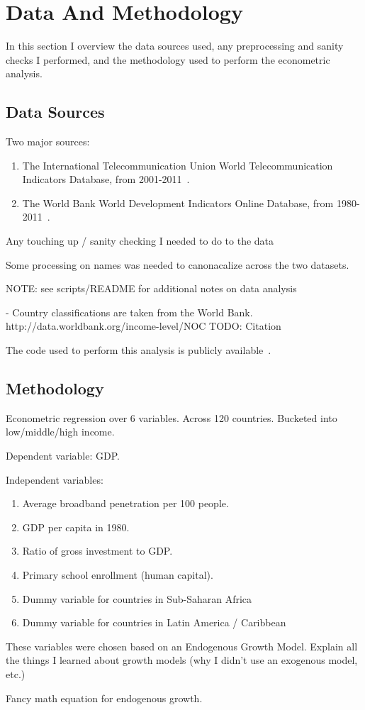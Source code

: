\section{Data And Methodology}
\label{sec:data_and_methodology}

In this section I overview the data sources used, any preprocessing and sanity
checks I performed, and the methodology used to perform the econometric
analysis.

\subsection{Data Sources}

Two major sources:
\begin{enumerate}
\item The International Telecommunication Union World Telecommunication Indicators
Database, from 2001-2011~\cite{itu}.
\item The World Bank World Development Indicators Online Database, from
1980-2011~\cite{wdi}.
\end{enumerate}

Any touching up / sanity checking I needed to do to the data

Some processing on names was needed to canonacalize across the two datasets.

NOTE: see scripts/README for additional notes on data analysis

- Country classifications are taken from the World
Bank. http://data.worldbank.org/income-level/NOC
TODO: Citation

The code used to perform this analysis is publicly available~\cite{github}.

\subsection{Methodology}

Econometric regression over 6 variables.
Across 120 countries.
Bucketed into low/middle/high income.

Dependent variable: GDP.

Independent variables:
\begin{enumerate}
\item Average broadband penetration per 100 people.
\item GDP per capita in 1980.
\item Ratio of gross investment to GDP.
\item Primary school enrollment (human capital).
\item Dummy variable for countries in Sub-Saharan Africa
\item Dummy variable for countries in Latin America / Caribbean
\end{enumerate}

These variables were chosen based on an Endogenous Growth Model.
Explain all the things I learned about growth models (why I didn't use an
exogenous model, etc.)

Fancy math equation for endogenous growth.
